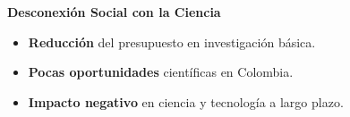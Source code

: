 \begin{frame}{\textbf{Desconexión Social con la Ciencia}}
  \begin{block}{}
    \begin{itemize}
      \item \textbf{Reducción} del presupuesto en investigación básica.
        \pause
      \item \textbf{Pocas oportunidades} científicas en Colombia.
        \pause
      \item \textbf{Impacto negativo} en ciencia y tecnología a largo plazo.
    \end{itemize}
  \end{block}
\end{frame}
